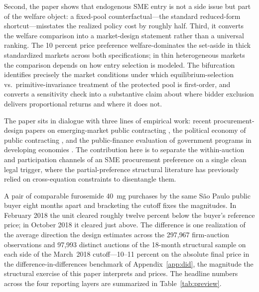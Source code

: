 Second, the paper shows that endogenous SME entry is not a side issue but part of the welfare object: a fixed-pool counterfactual---the standard reduced-form shortcut---misstates the realized policy cost by roughly half. Third, it converts the welfare comparison into a market-design statement rather than a universal ranking. The 10 percent price preference welfare-dominates the set-aside in thick standardized markets across both specifications; in thin heterogeneous markets the comparison depends on how entry selection is modeled. The bifurcation identifies precisely the market conditions under which equilibrium-selection vs.\ primitive-invariance treatment of the protected pool is first-order, and converts a sensitivity check into a substantive claim about where bidder exclusion delivers proportional returns and where it does not.

The paper sits in dialogue with three lines of empirical work: recent procurement-design papers on emerging-market public contracting \citep{decarolis2024, coviello2026, ferraz2016, szerman2023}, the political economy of public contracting \citep{colonnelli2022}, and the public-finance evaluation of government programs in developing economies \citep{best2023, bandiera2021, olken2007}. The contribution here is to separate the within-auction and participation channels of an SME procurement preference on a single clean legal trigger, where the partial-preference structural literature has previously relied on cross-equation constraints to disentangle them.

A pair of comparable furosemide 40~mg purchases by the same S\~ao Paulo public buyer eight months apart and bracketing the cutoff fixes the magnitudes. In February 2018 the unit cleared roughly twelve percent below the buyer's reference price; in October 2018 it cleared just above. The difference is one realization of the average direction the design estimates across the 297{,}967 firm-auction observations and 97{,}993 distinct auctions of the 18-month structural sample on each side of the March~2018 cutoff---10--11 percent on the absolute final price in the difference-in-differences benchmark of Appendix~\ref{app:did}, the magnitude the structural exercise of this paper interprets and prices. The headline numbers across the four reporting layers are summarized in Table~\ref{tab:preview}.


